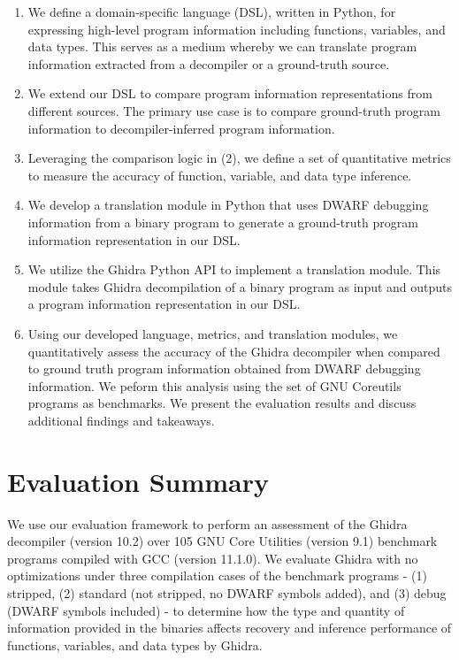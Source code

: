 \begin{enumerate}
    \item We define a domain-specific language (DSL), written in Python, for expressing high-level program information including functions, variables, and data types. This serves as a medium whereby we can translate program information extracted from a decompiler or a ground-truth source.
    \item We extend our DSL to compare program information representations from different sources. The primary use case is to compare ground-truth program information to decompiler-inferred program information.
    \item Leveraging the comparison logic in (2), we define a set of quantitative metrics to measure the accuracy of function, variable, and data type inference.
    \item We develop a translation module in Python that uses DWARF debugging information from a binary program to generate a ground-truth program information representation in our DSL.
    \item We utilize the Ghidra Python API to implement a translation module. This module takes Ghidra decompilation of a binary program as input and outputs a program information representation in our DSL.
    \item Using our developed language, metrics, and translation modules, we quantitatively assess the accuracy of the Ghidra decompiler when compared to ground truth program information obtained from DWARF debugging information. We peform this analysis using the set of GNU Coreutils programs as benchmarks. We present the evaluation results and discuss additional findings and takeaways.
\end{enumerate}

\section{Evaluation Summary}

We use our evaluation framework to perform an assessment of the Ghidra decompiler (version 10.2) over 105 GNU Core Utilities (version 9.1) benchmark programs compiled with GCC (version 11.1.0). We evaluate Ghidra with no optimizations under three compilation cases of the benchmark programs - (1) stripped, (2) standard (not stripped, no DWARF symbols added), and (3) debug (DWARF symbols included) - to determine how the type and quantity of information provided in the binaries affects recovery and inference performance of functions, variables, and data types by Ghidra.

